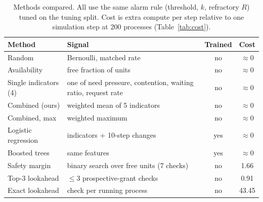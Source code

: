 \documentclass[conference]{IEEEtran}
\begin{document}
\begin{table}[t]
\centering\footnotesize
\caption{Methods compared. All use the same alarm rule (threshold, $k$, refractory $R$) tuned on the tuning split. Cost is extra compute per step relative to one simulation step at 200 processes (Table~\ref{tab:cost}).}
\label{tab:methods}
\begin{tabular}{>{\raggedright\arraybackslash}p{2.1cm}>{\raggedright\arraybackslash}p{2.9cm}cc}
\toprule
Method & Signal & Trained & Cost \\
\midrule
Random & Bernoulli, matched rate & no & $\approx$0 \\
Availability & free fraction of units & no & $\approx$0 \\
Single indicators (4) & one of need pressure, contention, waiting ratio, request rate & no & $\approx$0 \\
Combined (ours) & weighted mean of 5 indicators & no & $\approx$0 \\
Combined, max & weighted maximum & no & $\approx$0 \\
Logistic regression & 5 indicators + 10-step changes & yes & $\approx$0 \\
Boosted trees & same features & yes & $\approx$0 \\
Safety margin & binary search over free units (7 checks) & no & 1.66 \\
Top-3 lookahead & $\le$3 prospective-grant checks & no & 0.91 \\
Exact lookahead & 1 check per running process & no & 43.45 \\
\bottomrule
\end{tabular}
\end{table}
\end{document}

